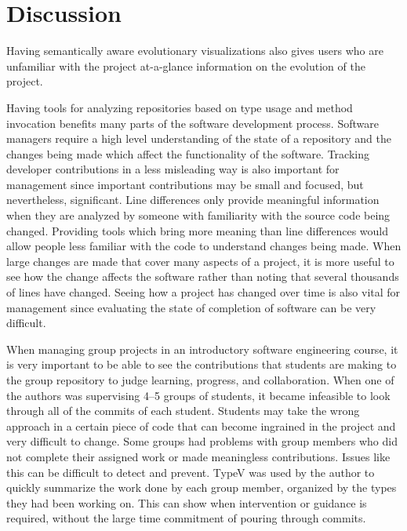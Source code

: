\section{Discussion}

Having semantically aware evolutionary visualizations also gives users who are unfamiliar with the project at-a-glance information on the evolution of the project.

Having tools for analyzing repositories based on type usage and method invocation benefits many parts of the software development process. Software managers require a high level understanding of the state of a repository and the changes being made which affect the functionality of the software. Tracking developer contributions in a less misleading way is also important for management since important contributions may be small and focused, but nevertheless, significant. Line differences only provide meaningful information when they are analyzed by someone with familiarity with the source code being changed. Providing tools which bring more meaning than line differences would allow people less familiar with the code to understand changes being made. When large changes are made that cover many aspects of a project, it is more useful to see how the change affects the software rather than noting that several thousands of lines have changed. Seeing how a project has changed over time is also vital for management since evaluating the state of completion of software can be very difficult.

When managing group projects in an introductory software engineering course, it is very important to be able to see the contributions that students are making to the group repository to judge learning, progress, and collaboration. When one of the authors was supervising 4--5 groups of students, it became infeasible to look through all of the commits of each student. Students may take the wrong approach in a certain piece of code that can become ingrained in the project and very difficult to change. Some groups had problems with group members who did not complete their assigned work or made meaningless contributions. Issues like this can be difficult to detect and prevent. TypeV was used by the author to quickly summarize the work done by each group member, organized by the types they had been working on. This can show when intervention or guidance is required, without the large time commitment of pouring through commits.

